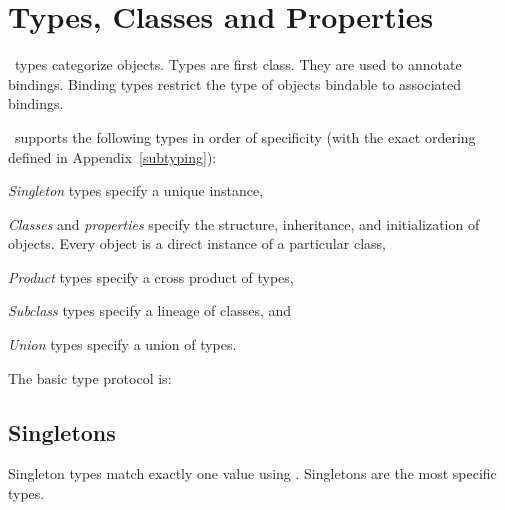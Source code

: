 \documentclass[twoside,twocolumn,9pt]{extarticle}
\begin{document}
\section{Types, Classes and Properties}

\goo\ types categorize objects.  Types are first class.  They are used
to annotate bindings.  Binding types restrict the type of objects
bindable to associated bindings.

\goo\ supports the following types in order of specificity 
(with the exact ordering defined in Appendix~\ref{subtyping}):
\begin{packeditemize}
\item {\it Singleton} types specify a unique instance,
\item {\it Classes} and {\it properties} specify the structure, 
inheritance, and
initialization of objects.  Every object is a direct instance of a
particular class,
\item {\it Product} types specify a cross product of types, 
\item {\it Subclass} types specify a lineage of classes, and
\item {\it Union} types specify a union of types.
\end{packeditemize}

The basic type protocol is:

\begin{defs}
% 
% 
\end{defs}

\subsection{Singletons}

Singleton types match exactly one value using \kode{==}.  Singletons are 
the most specific types.
\end{document}
